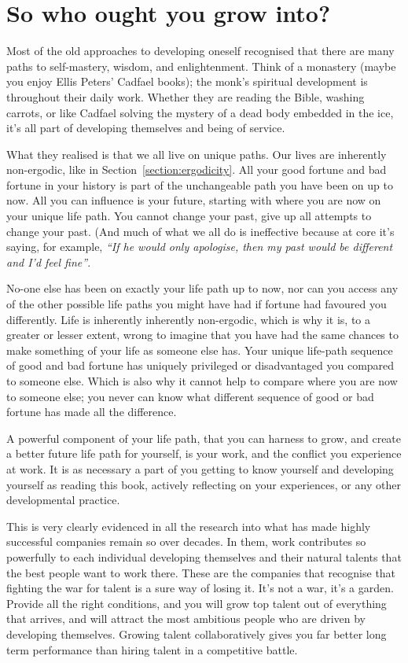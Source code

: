 \section{So who ought you grow into?}
Most of the old approaches to developing oneself recognised that there are many paths to self-mastery, wisdom, and enlightenment. Think of a monastery (maybe you enjoy Ellis Peters’ Cadfael books); the monk’s spiritual development is throughout their daily work. Whether they are reading the Bible, washing carrots, or like Cadfael solving the mystery of a dead body embedded in the ice, it's all part of developing themselves and being of service.


What they realised is that we all live on unique paths. Our lives are inherently non\hyp{}ergodic, like in Section~\ref{section:ergodicity}. All your good fortune and bad fortune in your history is part of the unchangeable path you have been on up to now. All you can influence is your future, starting with where you are now on your unique life path. You cannot change your past, give up all attempts to change your past. (And much of what we all do is ineffective because at core it’s saying, for example, \emph{“If he would only apologise, then my past would be different and I’d feel fine”}. 


No-one else has been on exactly your life path up to now, nor can you access any of the other possible life paths you might have had if fortune had favoured you differently. Life is inherently inherently non\hyp{}ergodic, which is why it is, to a greater or lesser extent, wrong to imagine that you have had the same chances to make something of your life as someone else has. Your unique life\hyp{}path sequence of good and bad fortune has uniquely privileged or disadvantaged you compared to someone else. Which is also why it cannot help to compare where you are now to someone else; you never can know what different sequence of good or bad fortune has made all the difference. 


A powerful component of your life path, that you can harness to grow, and create a better future life path for yourself, is your work, and the conflict you experience at work. It is as necessary a part of you getting to know yourself and developing yourself as reading this book, actively reflecting on your experiences, or any other developmental practice\cite{laske-vol1, sen-development}.


This is very clearly evidenced in all the research into what has made highly successful companies remain so over decades. In them, work contributes so powerfully to each individual developing themselves and their natural talents that the best people want to work there. These are the companies that recognise that fighting the war for talent is a sure way of losing it. It's not a war, it's a garden. Provide all the right conditions, and you will grow top talent out of everything that arrives, and will attract the most ambitious people who are driven by developing themselves. Growing talent collaboratively gives you far better long term performance than hiring talent in a competitive battle.


